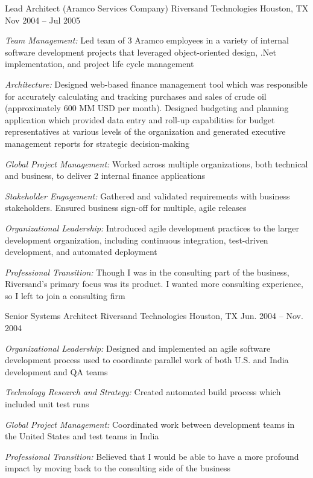 \begin{cventries}

\cventry 
{Lead Architect (Aramco Services Company)}
{Riversand Technologies}
{Houston, TX}
{Nov 2004 – Jul 2005}
{ %
\begin{cvitems}
\item {\emph{Team Management:} Led team of 3 Aramco employees in a variety of internal software development projects that leveraged object-oriented design, .Net implementation, and project life cycle management }
\item {\emph{Architecture:} Designed web-based finance management tool which was responsible for accurately calculating and tracking purchases and sales of crude oil (approximately 600 MM USD per month). Designed budgeting and planning application which provided data entry and roll-up capabilities for budget representatives at various levels of the organization and generated executive management reports for strategic decision-making }
\item {\emph{Global Project Management:} Worked across multiple organizations, both technical and business, to deliver 2 internal finance applications }
\item {\emph{Stakeholder Engagement:} Gathered and validated requirements with business stakeholders. Ensured business sign-off for multiple, agile releases }
\item {\emph{Organizational Leadership:} Introduced agile development practices to the larger development organization, including continuous integration, test-driven development, and automated deployment }
\item {\emph{Professional Transition:} Though I was in the consulting part of the business, Riversand’s primary focus was its product. I wanted more consulting experience, so I left to join a consulting firm }
\end{cvitems}
}


\cventry 
{Senior Systems Architect}
{Riversand Technologies}
{Houston, TX}
{Jun. 2004 – Nov. 2004}
{ %
\begin{cvitems}
\item {\emph{Organizational Leadership:} Designed and implemented an agile software development process used to coordinate parallel work of both U.S. and India development and QA teams }
\item {\emph{Technology Research and Strategy:} Created automated build process which included unit test runs }
\item {\emph{Global Project Management:} Coordinated work between development teams in the United States and test teams in India }
\item {\emph{Professional Transition:} Believed that I would be able to have a more profound impact by moving back to the consulting side of the business }
\end{cvitems}
}


\end{cventries}
